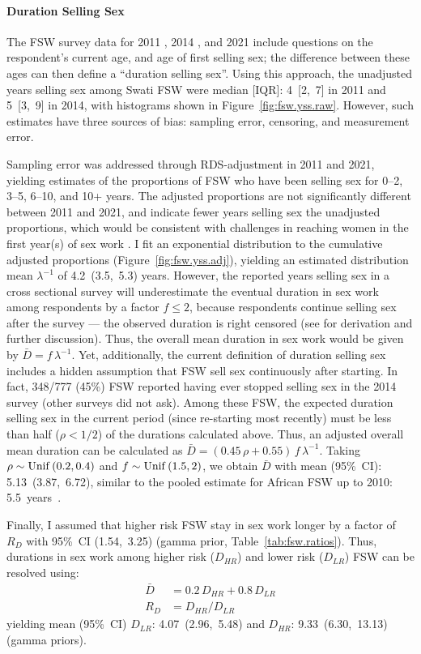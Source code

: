 \paragraph{Duration Selling Sex}
The FSW survey data for 2011 \cite{Baral2014}, 2014 \cite{EswKP2014}, and 2021 \cite{EswIBBS2022}
include questions on the respondent's current age, and age of first selling sex;
the difference between these ages can then define a ``duration selling sex''.
Using this approach, the unadjusted years selling sex among Swati FSW were
median [IQR]: 4~[2,~7] in 2011 and 5~[3,~9] in 2014,
with histograms shown in Figure~\ref{fig:fsw.yss.raw}.
However, such estimates have three sources of bias:
sampling error, censoring, and measurement error.
\par
Sampling error was addressed through RDS-adjustment in 2011 and 2021,
yielding estimates of the proportions of FSW
who have been selling sex for 0--2, 3--5, 6--10, and 10+ years.
The adjusted proportions are not significantly different between 2011 and 2021, and
indicate fewer years selling sex \vs the unadjusted proportions, which would be consistent with
challenges in reaching women in the first year(s) of sex work \cite{Cheuk2020}.
I fit an exponential distribution to the cumulative adjusted proportions
(Figure~\ref{fig:fsw.yss.adj}), yielding an estimated distribution mean
${\lambda}^{-1}$ of 4.2~(3.5,~5.3) years.
However, the reported years selling sex in a cross sectional survey
will underestimate the eventual duration in sex work among respondents by a factor $f \le 2$,
because respondents continue selling sex after the survey
--- \ie the observed duration is right censored
(see  for derivation and further discussion).
Thus, the overall mean duration in sex work would be given by $\bar{D} = f\,\lambda^{-1}$.
Yet, additionally, the current definition of duration selling sex
includes a hidden assumption that FSW sell sex continuously after starting.
In fact, 348/777 (45\%) FSW reported having ever stopped selling sex
in the 2014 survey \cite{EswKP2014} (other surveys did not ask).
Among these FSW, the expected duration selling sex in the current period
(\ie since re-starting most recently)
must be less than half ($\rho < 1/2$) of the durations calculated above.
Thus, an adjusted overall mean duration can be calculated as
$\bar{D} = (0.45\,\rho + 0.55)\,f\,\lambda^{-1}$.
Taking $\rho \sim \operatorname{Unif}\,(0.2,0.4)$ and $f \sim \operatorname{Unif}\,(1.5,2)$,
we obtain $\bar{D}$ with mean (95\%~CI): 5.13~(3.87,~6.72),
similar to the pooled estimate for African FSW up to 2010: 5.5~years~\cite{Fazito2012}.
\par
Finally, I assumed that higher risk FSW stay in sex work longer by a factor of
$R_{D}$ with 95\%~CI (1.54,~3.25) (gamma prior, Table~\ref{tab:fsw.ratios}).
Thus, durations in sex work among higher risk ($D_{HR}$) and lower risk ($D_{LR}$) FSW
can be resolved using:
\begin{equation}
  \begin{aligned}
    \bar{D} &= 0.2\,D_{HR} + 0.8\,D_{LR} \\
    R_{D} &= D_{HR} / D_{LR}
  \end{aligned}
\end{equation}
yielding mean (95\%~CI) $D_{LR}$: 4.07~(2.96,~5.48) and $D_{HR}$: 9.33~(6.30,~13.13) (gamma priors).
